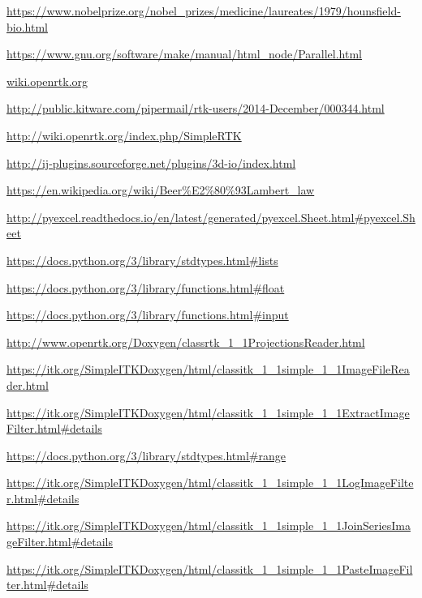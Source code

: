 \documentclass[a4paper,12pt, doubleside]{report}
\begin{document}
\begin{thebibliography}{1}
        \url{https://www.nobelprize.org/nobel_prizes/medicine/laureates/1979/hounsfield-bio.html}
    
        \url{https://www.gnu.org/software/make/manual/html_node/Parallel.html}
        
        \url{wiki.openrtk.org}
        
        \url{http://public.kitware.com/pipermail/rtk-users/2014-December/000344.html}
        
        \url{http://wiki.openrtk.org/index.php/SimpleRTK}
        
        \url{http://ij-plugins.sourceforge.net/plugins/3d-io/index.html}
    
        \url{https://en.wikipedia.org/wiki/Beer%E2%80%93Lambert_law}
        
        \url{http://pyexcel.readthedocs.io/en/latest/generated/pyexcel.Sheet.html#pyexcel.Sheet}
        
        \url{https://docs.python.org/3/library/stdtypes.html#lists}
        
        \url{https://docs.python.org/3/library/functions.html#float}
        
        \url{https://docs.python.org/3/library/functions.html#input}
        
        \url{http://www.openrtk.org/Doxygen/classrtk_1_1ProjectionsReader.html}
    
        \url{https://itk.org/SimpleITKDoxygen/html/classitk_1_1simple_1_1ImageFileReader.html}
    
        \url{https://itk.org/SimpleITKDoxygen/html/classitk_1_1simple_1_1ExtractImageFilter.html#details}
    
        \url{https://docs.python.org/3/library/stdtypes.html#range}
        
        \url{https://itk.org/SimpleITKDoxygen/html/classitk_1_1simple_1_1LogImageFilter.html#details}
        
        \url{https://itk.org/SimpleITKDoxygen/html/classitk_1_1simple_1_1JoinSeriesImageFilter.html#details}
        
        \url{https://itk.org/SimpleITKDoxygen/html/classitk_1_1simple_1_1PasteImageFilter.html#details}
        
    \end{thebibliography}
\end{document}
